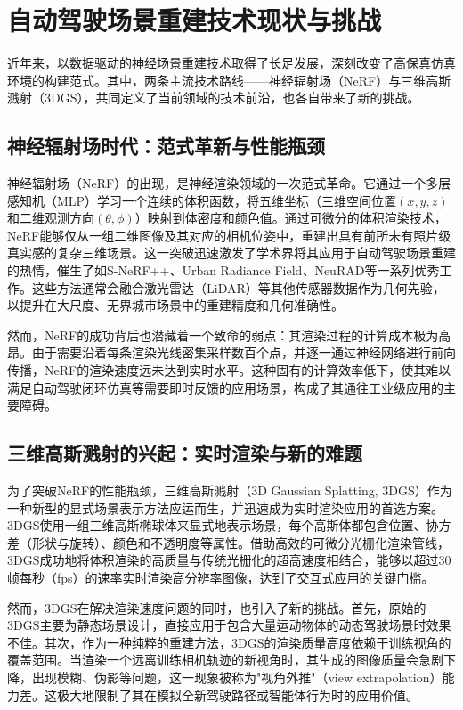 \section{自动驾驶场景重建技术现状与挑战}

近年来，以数据驱动的神经场景重建技术取得了长足发展，深刻改变了高保真仿真环境的构建范式。其中，两条主流技术路线——神经辐射场（NeRF）与三维高斯溅射（3DGS），共同定义了当前领域的技术前沿，也各自带来了新的挑战。

\subsection{神经辐射场时代：范式革新与性能瓶颈}

神经辐射场（NeRF）的出现，是神经渲染领域的一次范式革命\cite{mildenhall2021nerf}。它通过一个多层感知机（MLP）学习一个连续的体积函数，将五维坐标（三维空间位置$(x, y, z)$和二维观测方向$(\theta, \phi)$）映射到体密度和颜色值。通过可微分的体积渲染技术，NeRF能够仅从一组二维图像及其对应的相机位姿中，重建出具有前所未有照片级真实感的复杂三维场景。这一突破迅速激发了学术界将其应用于自动驾驶场景重建的热情，催生了如S-NeRF++、Urban Radiance Field、NeuRAD等一系列优秀工作\cite{chen2025snerf}。这些方法通常会融合激光雷达（LiDAR）等其他传感器数据作为几何先验，以提升在大尺度、无界城市场景中的重建精度和几何准确性\cite{lin2024drivinggaussian}。

然而，NeRF的成功背后也潜藏着一个致命的弱点：其渲染过程的计算成本极为高昂。由于需要沿着每条渲染光线密集采样数百个点，并逐一通过神经网络进行前向传播，NeRF的渲染速度远未达到实时水平\cite{lin2024drivinggaussian}。这种固有的计算效率低下，使其难以满足自动驾驶闭环仿真等需要即时反馈的应用场景，构成了其通往工业级应用的主要障碍\cite{lin2024drivinggaussian}。

\subsection{三维高斯溅射的兴起：实时渲染与新的难题}

为了突破NeRF的性能瓶颈，三维高斯溅射（3D Gaussian Splatting, 3DGS）作为一种新型的显式场景表示方法应运而生，并迅速成为实时渲染应用的首选方案\cite{kerbl2023gaussian}。3DGS使用一组三维高斯椭球体来显式地表示场景，每个高斯体都包含位置、协方差（形状与旋转）、颜色和不透明度等属性\cite{kerbl2023gaussian}。借助高效的可微分光栅化渲染管线，3DGS成功地将体积渲染的高质量与传统光栅化的超高速度相结合，能够以超过30帧每秒（fps）的速率实时渲染高分辨率图像，达到了交互式应用的关键门槛\cite{sun2025splatflow}。

然而，3DGS在解决渲染速度问题的同时，也引入了新的挑战。首先，原始的3DGS主要为静态场景设计，直接应用于包含大量运动物体的动态驾驶场景时效果不佳\cite{sun2025splatflow}。其次，作为一种纯粹的重建方法，3DGS的渲染质量高度依赖于训练视角的覆盖范围。当渲染一个远离训练相机轨迹的新视角时，其生成的图像质量会急剧下降，出现模糊、伪影等问题，这一现象被称为"视角外推"（view extrapolation）能力差\cite{yan2024street}。这极大地限制了其在模拟全新驾驶路径或智能体行为时的应用价值。

